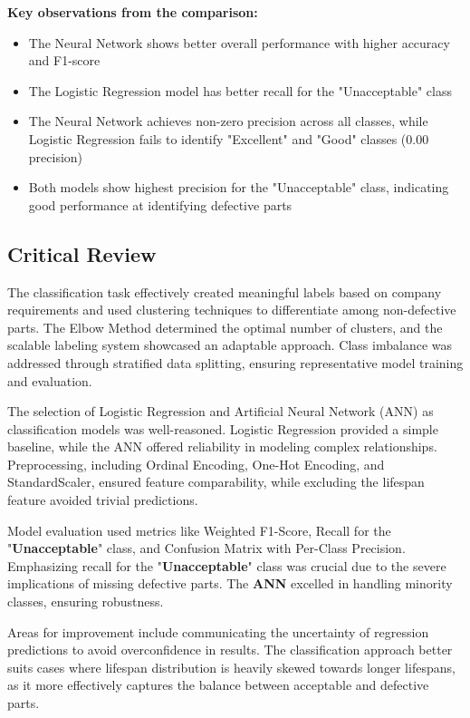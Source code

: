 \documentclass{article}
\begin{document}
\noindent\textbf{Key observations from the comparison:}
\begin{itemize}
    \item The Neural Network shows better overall performance with higher accuracy and F1-score
    
    \item The Logistic Regression model has better recall for the "Unacceptable" class
    
    \item The Neural Network achieves non-zero precision across all classes, while Logistic Regression fails to identify "Excellent" and "Good" classes ($0.00$ precision)
    
    \item Both models show highest precision for the "Unacceptable" class, indicating good performance at identifying defective parts
\end{itemize}

\subsection{Critical Review}

The classification task effectively created meaningful labels based on company requirements and used clustering techniques to differentiate among non-defective parts. The Elbow Method determined the optimal number of clusters, and the scalable labeling system showcased an adaptable approach. Class imbalance was addressed through stratified data splitting, ensuring representative model training and evaluation.

The selection of Logistic Regression and Artificial Neural Network (ANN) as classification models was well-reasoned. Logistic Regression provided a simple baseline, while the ANN offered reliability in modeling complex relationships. Preprocessing, including Ordinal Encoding, One-Hot Encoding, and StandardScaler, ensured feature comparability, while excluding the lifespan feature avoided trivial predictions.

Model evaluation used metrics like Weighted F1-Score, Recall for the "\textbf{Unacceptable}" class, and Confusion Matrix with Per-Class Precision. Emphasizing recall for the "\textbf{Unacceptable}" class was crucial due to the severe implications of missing defective parts. The \textbf{ANN} excelled in handling minority classes, ensuring robustness.

Areas for improvement include communicating the uncertainty of regression predictions to avoid overconfidence in results. The classification approach better suits cases where lifespan distribution is heavily skewed towards longer lifespans, as it more effectively captures the balance between acceptable and defective parts.
\end{document}
